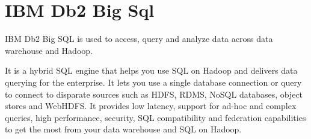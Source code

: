\section{IBM Db2 Big Sql}

IBM Db2 Big SQL is used to access, query and analyze data across data warehouse
and Hadoop.

It is a hybrid SQL engine that helps you use SQL on Hadoop and delivers data 
querying for the enterprise. It lets you use a single database connection or 
query to connect to disparate sources such as HDFS, RDMS, NoSQL databases, 
object stores and WebHDFS. It provides low latency, support for ad-hoc and 
complex queries, high performance, security, SQL compatibility and federation
capabilities to get the most from your data warehouse and SQL on Hadoop.
\cite{IBM DB2 Big Sql}
 
